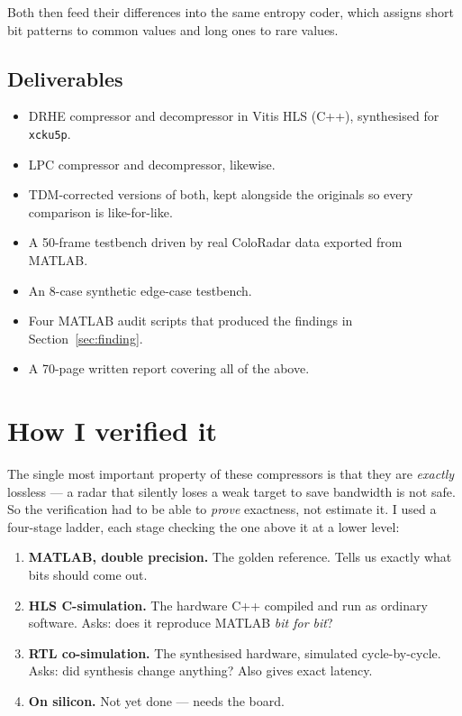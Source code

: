 \documentclass[11pt,a4paper]{article}
\begin{document}
Both then feed their differences into the same entropy coder, which assigns
short bit patterns to common values and long ones to rare values.

\subsection{Deliverables}

\begin{itemize}
\item DRHE compressor and decompressor in Vitis HLS (C++), synthesised for
\texttt{xcku5p}.
\item LPC compressor and decompressor, likewise.
\item TDM-corrected versions of both, kept alongside the originals so every
comparison is like-for-like.
\item A 50-frame testbench driven by real ColoRadar data exported from MATLAB.
\item An 8-case synthetic edge-case testbench.
\item Four MATLAB audit scripts that produced the findings in
Section~\ref{sec:finding}.
\item A 70-page written report covering all of the above.
\end{itemize}

\section{How I verified it}

The single most important property of these compressors is that they are
\emph{exactly} lossless --- a radar that silently loses a weak target to save
bandwidth is not safe. So the verification had to be able to \emph{prove}
exactness, not estimate it. I used a four-stage ladder, each stage checking the
one above it at a lower level:

\begin{enumerate}
\item \textbf{MATLAB, double precision.} The golden reference. Tells us exactly
what bits should come out.
\item \textbf{HLS C-simulation.} The hardware C++ compiled and run as ordinary
software. Asks: does it reproduce MATLAB \emph{bit for bit}?
\item \textbf{RTL co-simulation.} The synthesised hardware, simulated
cycle-by-cycle. Asks: did synthesis change anything? Also gives exact latency.
\item \textbf{On silicon.} Not yet done --- needs the board.
\end{enumerate}
\end{document}
